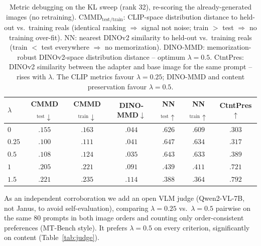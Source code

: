 \documentclass{article}
\begin{document}
\begin{table}[h]
\centering\small
\setlength{\tabcolsep}{5pt}
\begin{tabular}{lcccccc}
\toprule
$\lambda$ & CMMD$_{\text{test}}\downarrow$ & CMMD$_{\text{train}}\downarrow$ & DINO-MMD$\downarrow$ & NN$_{\text{test}}\uparrow$ & NN$_{\text{train}}\uparrow$ & CtntPres$\uparrow$ \\
\midrule
$0$    & $.155$ & $.163$ & $.044$ & $.626$ & $.609$ & $.303$ \\
$0.25$ & $\mathbf{.100}$ & $.111$ & $.041$ & $.647$ & $.634$ & $.317$ \\
$0.5$  & $.108$ & $.124$ & $\mathbf{.035}$ & $.643$ & $.633$ & $.389$ \\
$1$    & $.205$ & $.221$ & $.091$ & $.439$ & $.411$ & $.721$ \\
$1.5$  & $.221$ & $.235$ & $.114$ & $.388$ & $.364$ & $.792$ \\
\bottomrule
\end{tabular}
\caption{Metric debugging on the KL sweep (rank 32), re-scoring the
already-generated images (no retraining). CMMD$_{\text{test/train}}$: CLIP-space
distribution distance to held-out vs.\ training reals (identical ranking $\Rightarrow$
signal not noise; train $>$ test $\Rightarrow$ no training over-fit). NN: nearest
DINOv2 similarity to held-out vs.\ training reals (train $<$ test everywhere
$\Rightarrow$ no memorization). DINO-MMD: memorization-robust DINOv2-space
distribution distance -- optimum $\lambda{=}0.5$. CtntPres: DINOv2 similarity
between the adapter and base image for the same prompt -- rises with $\lambda$. The
CLIP metrics favour $\lambda{=}0.25$; DINO-MMD and content preservation favour
$\lambda{=}0.5$.}
\label{tab:metric-debug}
\end{table}

As an independent corroboration we add an open VLM judge (Qwen2-VL-7B, not Janus,
to avoid self-evaluation), comparing $\lambda{=}0.25$ vs.\ $\lambda{=}0.5$ pairwise
on the same $80$ prompts in both image orders and counting only order-consistent
preferences (MT-Bench style). It prefers $\lambda{=}0.5$ on every criterion,
significantly on content (Table~\ref{tab:judge}).
\end{document}
